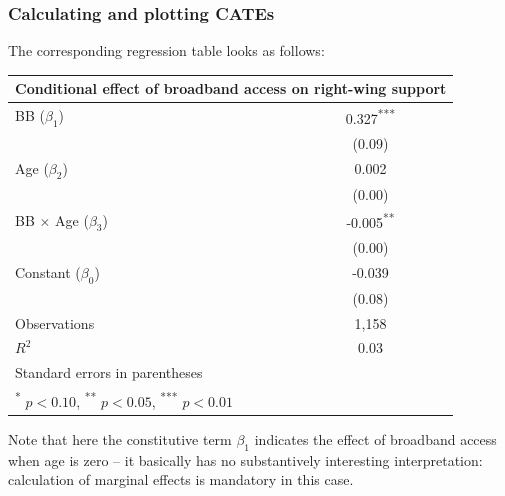 \documentclass[12pt,english,dvipsnames,aspectratio=169,handout]{beamer}\usepackage[]{graphicx}\usepackage[]{xcolor}
\begin{document}
\begin{frame}
  \frametitle{Calculating and plotting CATEs}
\footnotesize
The corresponding regression table looks as follows:

\tiny
\centering
\begin{tabular}{l*{1}{c}}
\toprule
\multicolumn{2}{c}{Conditional effect of broadband access on right-wing support}\\
\midrule
BB ($\beta_1$)             &    0.327\textsuperscript{***}\\
                &   (0.09)         \\
Age ($\beta_2$) &    0.002         \\
                &   (0.00)         \\
BB $\times$ Age ($\beta_3$) &   -0.005\textsuperscript{**} \\
                &   (0.00)         \\
Constant ($\beta_0$)  &   -0.039         \\
                &   (0.08)         \\
\midrule
Observations    &     1,158         \\
\(R^{2}\)       &     0.03         \\
\bottomrule
\multicolumn{2}{l}{Standard errors in parentheses}\\
\multicolumn{2}{l}{\textsuperscript{*} \(p<0.10\), \textsuperscript{**} \(p<0.05\), \textsuperscript{***} \(p<0.01\)}\\
\end{tabular}

\flushleft\footnotesize
Note that here the constitutive term $\beta_1$ indicates the effect of broadband access when age is zero -- it basically has no substantively interesting interpretation: calculation of marginal effects is mandatory in this case. 

\footnotesize


\end{frame}
\end{document}
